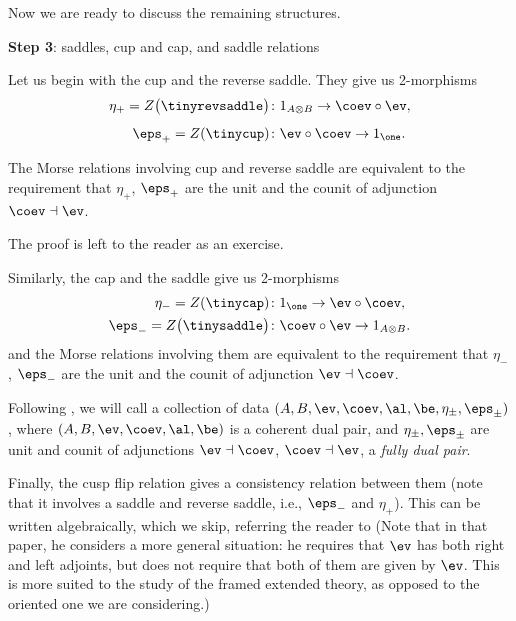 Now we are ready to discuss the remaining structures.

\textbf{Step 3}: saddles, cup and cap, and saddle relations

Let us begin with the cup and the reverse saddle. They give us 2-morphisms
\begin{equation}\label{e:adj-plus}
  \begin{aligned}
    \eta_+= Z\bigl(\tinyrevsaddle\bigr)&\colon 1_{A\otimes B}
             \to \coev\circ \ev,\\[5pt]
    \eps_+= Z(\tinycup) & \colon \ev \circ \coev \to 1_{\one}.
  \end{aligned}
\end{equation}



\begin{lemma}\label{l:morse-cup-saddle}
  The Morse relations involving cup and reverse saddle are equivalent to the
  requirement that $\eta_+$, $\eps_+$ are the unit and the counit of adjunction
  $\coev \dashv \ev$.
\end{lemma}
The proof is left to the reader as an exercise.

Similarly, the cap and the saddle give us 2-morphisms
\begin{equation}\label{e:adj-minus}
  \begin{aligned}
    \eta_-= Z(\tinycap)&\colon 1_{\one} \to \ev\circ \coev,\\
    \eps_-= Z\bigl(\tinysaddle\bigr) & \colon \coev \circ \ev
                                        \to 1_{A\otimes B}.
  \end{aligned}
\end{equation}
and the Morse relations involving them are equivalent to the requirement that
$\eta_-$, $\eps_-$ are the unit and the counit of adjunction $\ev \dashv \coev$.

Following \cite{pstragowski}, we will call a collection of data
$(A, B, \ev, \coev, \al, \be, \eta_\pm, \eps_\pm)$, where
$(A, B, \ev, \coev, \al, \be)$ is a coherent dual pair, and
$\eta_\pm, \eps_\pm$ are unit and counit of adjunctions
$\ev\dashv \coev$, $\coev \dashv \ev$, a
\emph{fully dual pair}.


Finally, the cusp flip relation gives a consistency relation between them
(note that it involves a saddle and reverse saddle, i.e., $\eps_-$ and $\eta_+$).
This can be written algebraically, which we skip, referring the reader to
\cite[Section 3.2]{pstragowski} (Note that in that paper, he considers a more
general situation: he requires that $\ev$ has both right and left adjoints, but
does not require that both of them are given by $\ev$. This is more suited to
the study of the framed extended theory, as opposed to the oriented one we are
considering.)

